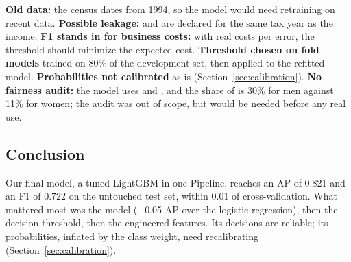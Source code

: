 \textbf{Old data:} the census dates from 1994, so the model would need
retraining on recent data. \textbf{Possible leakage:}  and
 are declared for the same tax year as the income.
\textbf{F1 stands in for business costs:} with real costs per error, the
threshold should minimize the expected cost. \textbf{Threshold chosen on fold
models} trained on 80\% of the development set, then applied to the refitted
model. \textbf{Probabilities not calibrated} as-is
(Section~\ref{sec:calibration}). \textbf{No fairness audit:} the model uses
 and , and the share of \pos{} is 30\% for men against
11\% for women; the audit was out of scope, but would be needed before any
real use.

\subsection{Conclusion}

Our final model, a tuned LightGBM in one Pipeline, reaches an AP of 0.821 and
an F1 of 0.722 on the untouched test set, within 0.01 of cross-validation.
What mattered most was the model (+0.05 AP over the logistic regression), then
the decision threshold, then the engineered features. Its decisions are reliable; its probabilities, inflated by the
class weight, need recalibrating (Section~\ref{sec:calibration}).
